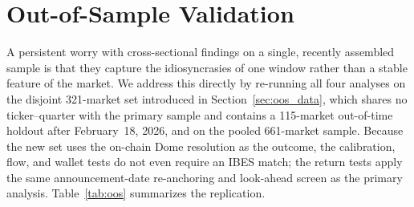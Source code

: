 \documentclass[11pt]{article}
\begin{document}
\section{Out-of-Sample Validation} \label{sec:oos}

A persistent worry with cross-sectional findings on a single, recently assembled sample is that they capture the idiosyncrasies of one window rather than a stable feature of the market. We address this directly by re-running all four analyses on the disjoint 321-market set introduced in Section~\ref{sec:oos_data}, which shares no ticker--quarter with the primary sample and contains a 115-market out-of-time holdout after February~18, 2026, and on the pooled 661-market sample. Because the new set uses the on-chain Dome resolution as the outcome, the calibration, flow, and wallet tests do not even require an IBES match; the return tests apply the same announcement-date re-anchoring and look-ahead screen as the primary analysis. Table~\ref{tab:oos} summarizes the replication.
\end{document}
